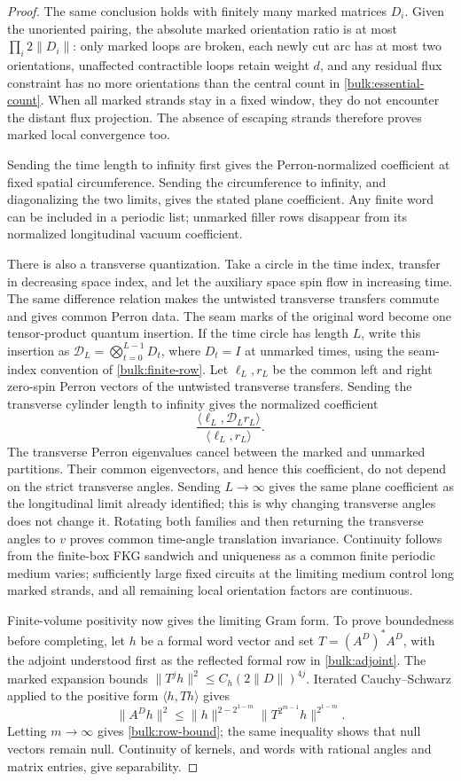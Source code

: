 \begin{proof}
The same conclusion holds with finitely many marked matrices
$D_i$. Given the unoriented pairing, the absolute marked
orientation ratio is at most $\prod_i2\|D_i\|$: only marked loops
are broken, each newly cut arc has at most two orientations,
unaffected contractible loops retain weight $d$, and any residual
flux constraint has no more orientations than the central count
in \eqref{bulk:essential-count}. When all marked strands stay in
a fixed window, they do not encounter the distant flux projection.
The absence of escaping strands therefore proves marked local
convergence too.

Sending the time length to infinity first gives the
Perron-normalized coefficient at fixed spatial circumference.
Sending the circumference to infinity, and diagonalizing the two
limits, gives the stated plane coefficient. Any finite word can
be included in a periodic list; unmarked filler rows disappear
from its normalized longitudinal vacuum coefficient.

There is also a transverse quantization. Take a circle in the time
index, transfer in decreasing space index, and let the auxiliary
space spin flow in increasing time. The same difference relation
makes the untwisted transverse transfers commute and gives common
Perron data. The seam marks of the original word become one
tensor-product quantum insertion. If the time circle has length $L$,
write this insertion as $\mathcal D_L=\bigotimes_{t=0}^{L-1}D_t$,
where $D_t=I$ at unmarked times, using the seam-index convention of
\eqref{bulk:finite-row}. Let $\ell_L,r_L$ be the common left and right
zero-spin Perron vectors of the untwisted transverse transfers.
Sending the transverse cylinder length to infinity gives the normalized
coefficient
\[
 \frac{\langle\ell_L,\mathcal D_L r_L\rangle}
      {\langle\ell_L,r_L\rangle}.
\]
The transverse Perron eigenvalues cancel between the marked and
unmarked partitions. Their common eigenvectors, and hence this
coefficient, do not depend on the strict transverse angles. Sending
$L\to\infty$ gives the same plane coefficient as the longitudinal
limit already identified; this is why changing transverse angles
does not change it. Rotating both families and
then returning the transverse angles to $v$ proves common
time-angle translation invariance. Continuity follows from the
finite-box FKG sandwich and uniqueness as a common finite periodic
medium varies; sufficiently large fixed circuits at the limiting
medium control long marked strands, and all remaining local
orientation factors are continuous.

Finite-volume positivity now gives the limiting Gram form. To
prove boundedness before completing, let $h$ be a formal word
vector and set $T=(A^D)^*A^D$, with the adjoint understood first
as the reflected formal row in \eqref{bulk:adjoint}. The
marked expansion bounds
$\|T^jh\|^2\le C_h(2\|D\|)^{4j}$. Iterated Cauchy--Schwarz applied
to the positive form $\langle h,Th\rangle$ gives
\[
 \|A^Dh\|^2
 \le \|h\|^{2-2^{1-m}}
       \|T^{2^{m-1}}h\|^{2^{1-m}}.
\]
Letting $m\to\infty$ gives \eqref{bulk:row-bound}; the same inequality
shows that null vectors remain null. Continuity of kernels, and
words with rational angles and matrix entries, give separability.
\end{proof}

